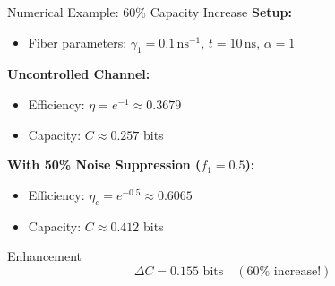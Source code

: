\documentclass[aspectratio=169,12pt]{beamer}
\begin{document}
\begin{frame}{Numerical Example: 60\% Capacity Increase}
\textbf{Setup:}
\begin{itemize}
\item Fiber parameters: $\gamma_1 = 0.1\, \text{ns}^{-1}$, $t = 10\, \text{ns}$, $\alpha = 1$
\end{itemize}

\vspace{0.3cm}

\textbf{Uncontrolled Channel:}
\begin{itemize}
\item Efficiency: $\eta = e^{-1} \approx 0.3679$
\item Capacity: $C \approx 0.257$ bits
\end{itemize}

\vspace{0.3cm}

\textbf{With 50\% Noise Suppression ($f_1 = 0.5$):}
\begin{itemize}
\item Efficiency: $\eta_c = e^{-0.5} \approx 0.6065$
\item Capacity: $C \approx 0.412$ bits
\end{itemize}

\vspace{0.3cm}

\begin{alertblock}{Enhancement}
$$\Delta C = 0.155 \text{ bits} \quad (60\% \text{ increase!})$$
\end{alertblock}
\end{frame}
\end{document}
